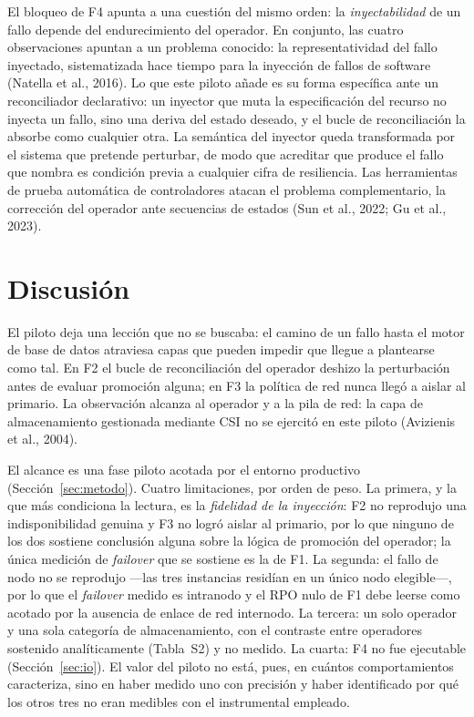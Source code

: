 \documentclass[12pt,twocolumn,letterpaper]{article}
\begin{document}
El bloqueo de F4 apunta a una cuestión del mismo orden: la \textit{inyectabilidad} de un fallo depende del endurecimiento del operador. En conjunto, las cuatro observaciones apuntan a un problema conocido: la representatividad del fallo inyectado, sistematizada hace tiempo para la inyección de fallos de software (Natella et al., 2016). Lo que este piloto añade es su forma específica ante un reconciliador declarativo: un inyector que muta la especificación del recurso no inyecta un fallo, sino una deriva del estado deseado, y el bucle de reconciliación la absorbe como cualquier otra. La semántica del inyector queda transformada por el sistema que pretende perturbar, de modo que acreditar que produce el fallo que nombra es condición previa a cualquier cifra de resiliencia. Las herramientas de prueba automática de controladores atacan el problema complementario, la corrección del operador ante secuencias de estados (Sun et al., 2022; Gu et al., 2023).


\section{Discusión}\label{sec:disc}
El piloto deja una lección que no se buscaba: el camino de un fallo hasta el motor de base de datos atraviesa capas que pueden impedir que llegue a plantearse como tal. En F2 el bucle de reconciliación del operador deshizo la perturbación antes de evaluar promoción alguna; en F3 la política de red nunca llegó a aislar al primario. La observación alcanza al operador y a la pila de red: la capa de almacenamiento gestionada mediante CSI no se ejercitó en este piloto (Avizienis et al., 2004).

El alcance es una fase piloto acotada por el entorno productivo (Sección~\ref{sec:metodo}). Cuatro limitaciones, por orden de peso. La primera, y la que más condiciona la lectura, es la \textit{fidelidad de la inyección}: F2 no reprodujo una indisponibilidad genuina y F3 no logró aislar al primario, por lo que ninguno de los dos sostiene conclusión alguna sobre la lógica de promoción del operador; la única medición de \textit{failover} que se sostiene es la de F1. La segunda: el fallo de nodo no se reprodujo —las tres instancias residían en un único nodo elegible—, por lo que el \textit{failover} medido es intranodo y el RPO nulo de F1 debe leerse como acotado por la ausencia de enlace de red internodo. La tercera: un solo operador y una sola categoría de almacenamiento, con el contraste entre operadores sostenido analíticamente (Tabla~S2) y no medido. La cuarta: F4 no fue ejecutable (Sección~\ref{sec:io}). El valor del piloto no está, pues, en cuántos comportamientos caracteriza, sino en haber medido uno con precisión y haber identificado por qué los otros tres no eran medibles con el instrumental empleado.
\end{document}
